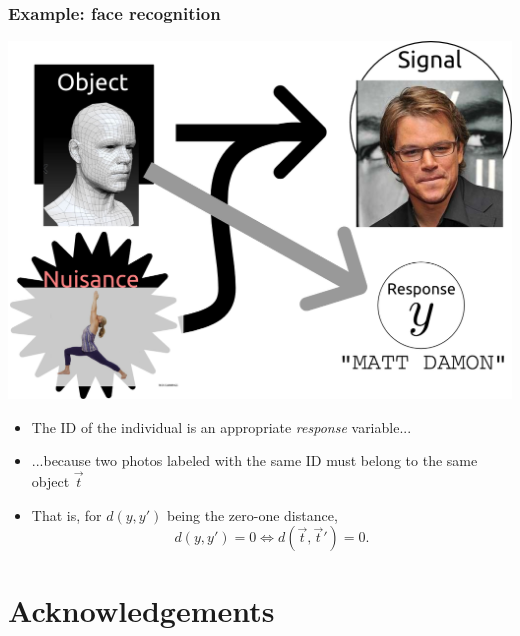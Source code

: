 \documentclass{beamer}
\begin{document}
\begin{frame}
\frametitle{Example: face recognition}
\begin{center}
\includegraphics[scale = 0.15]{defense_diagrams/face_3.png}
\end{center}
\begin{itemize}
\item The ID of the individual is an appropriate \emph{response} variable...\pause
\item ...because two photos labeled with the same ID must belong to the same object $\vec{t}$ \pause
\item That is, for $d(y, y')$ being the zero-one distance,
\[
d(y, y') = 0 \Leftrightarrow d(\vec{t}, \vec{t}') = 0.
\]
\end{itemize}

\end{frame}


\section*{Acknowledgements}

\begin{frame}
\sectionpage
\end{frame}
\end{document}
